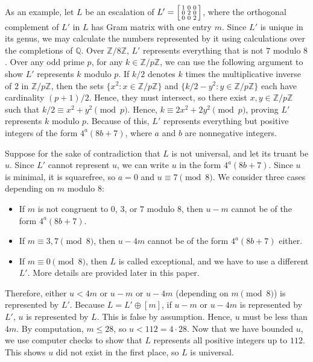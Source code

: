 \documentclass[letterpaper, 12pt]{article}
\begin{document}
As an example, let $L$ be an escalation of $L' = \begin{bsmallmatrix} 1 & 0 & 0 \\ 0 & 2 & 0 \\ 0 & 0 & 2 \end{bsmallmatrix}$, where the orthogonal complement of $L'$ in $L$ has Gram matrix with one entry $m$. Since $L'$ is unique in its genus, we may calculate the numbers represented by it using calculations over the completions of $\mathbb{Q}$. Over $\mathbb{Z}/8\mathbb{Z}$, $L'$ represents everything that is not $7$ modulo $8$. Over any odd prime $p$, for any $k \in \mathbb{Z}/p\mathbb{Z}$, we can use the following argument to show $L'$ represents $k$ modulo $p$. If $k/2$ denotes $k$ times the multiplicative inverse of $2$ in $\mathbb{Z}/p\mathbb{Z}$, then the sets $\{x^2 : x \in \mathbb{Z}/p\mathbb{Z}\}$ and $\{k/2 - y^2 : y \in \mathbb{Z}/p\mathbb{Z}\}$ each have cardinality $(p + 1)/2$. Hence, they must intersect, so there exist $x, y \in \mathbb{Z}/p\mathbb{Z}$ such that $k/2 \equiv x^2 + y^2 \pmod p$. Hence, $k \equiv 2x^2 + 2y^2 \pmod p$, proving $L'$ represents $k$ modulo $p$. Because of this, $L'$ represents everything but positive integers of the form $4^a (8b + 7)$, where $a$ and $b$ are nonnegative integers.

Suppose for the sake of contradiction that $L$ is not universal, and let its truant be $u$. Since $L'$ cannot represent $u$, we can write $u$ in the form $4^a (8b + 7)$. Since $u$ is minimal, it is squarefree, so $a = 0$ and $u \equiv 7 \pmod 8$. We consider three cases depending on $m$ modulo $8$:
\begin{itemize}
    \item If $m$ is not congruent to $0$, $3$, or $7$ modulo $8$, then $u-m$ cannot be of the form $4^a (8b + 7)$.
    \item If $m \equiv 3, 7 \pmod 8$, then $u-4m$ cannot be of the form $4^a (8b + 7)$ either.
    \item If $m \equiv 0 \pmod 8$, then $L$ is called exceptional, and we have to use a different $L'$. More details are provided later in this paper.
\end{itemize}

Therefore, either $u < 4m$ or $u - m$ or $u - 4m$ (depending on $m \pmod 8$) is represented by $L'$. Because $L = L' \oplus [m]$, if $u - m$ or $u - 4m$ is represented by $L'$, $u$ is represented by $L$. This is false by assumption. Hence, $u$ must be less than $4m$. By computation, $m \le 28$, so $u < 112 = 4 \cdot 28$. Now that we have bounded $u$, we use computer checks to show that $L$ represents all positive integers up to $112$. This shows $u$ did not exist in the first place, so $L$ is universal.
\end{document}
